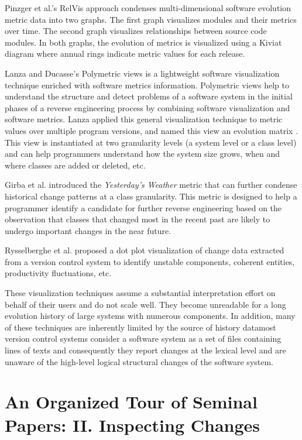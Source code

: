 \documentclass[runningheads,a4paper]{llncs}
\begin{document}
Pinzger et al.'s RelVis approach \cite{Pinzger05:sv} condenses multi-dimensional software evolution metric data into two graphs. The first graph visualizes modules and their metrics over time. The second graph visualizes relationships between source code modules. In both graphs, the evolution of metrics is visualized using a Kiviat diagram where annual rings indicate metric values for each release.

Lanza and Ducasse's Polymetric views \cite{Lanza2003} is a lightweight software visualization technique enriched with software metrics information. Polymetric views help to understand the structure and detect problems of a software system in the initial phases of a reverse engineering process by combining software visualization and software metrics. Lanza applied this general visualization technique to metric values over multiple program versions, and named this view an evolution matrix \cite{Lanza01:sv}. This view is instantiated at two granularity levels (a system level or a class level) and can help programmers understand how the system size grows, when and where classes are added or deleted, etc. 

Girba et al. \cite{Girba2004} introduced the {\it Yesterday's Weather} metric that can further condense historical change patterns at a class granularity. This metric is designed to help a programmer identify a candidate for further reverse engineering based on the observation that classes that changed most in the recent past are likely to undergo important changes in the near future. 
 
Rysselberghe et al. \cite{Rysselberghe2004a} proposed a dot plot visualization of change data extracted from a version control system to identify unstable components, coherent entities, productivity fluctuations, etc.  

These visualization techniques assume a substantial interpretation effort on behalf of their users and do not scale well. They become unreadable for a long evolution history of large systems with numerous components. In addition, many of these techniques are inherently limited by the source of history data\textemdash most version control systems consider a software system as a set of files containing lines of texts and consequently they report changes at the lexical level and are unaware of the high-level logical structural changes of the software system. 

\section{An Organized Tour of Seminal Papers: II. Inspecting Changes}
\label{sec:inspect}
\end{document}
